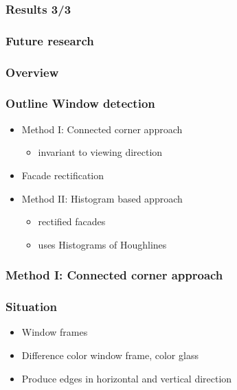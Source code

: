 \documentclass{beamer}
\begin{document}
\frame
{
	\frametitle{Results 3/3}
}

\frame
{
	\frametitle{Future research}

}

\frame
{
	\frametitle{Overview}
}




\frame
{
	\frametitle{Outline Window detection}
	\begin{itemize}
	\item  <+-| alert@+> Method I: Connected corner approach 
		\begin{itemize}
		\item  <+-| alert@+> invariant to viewing direction
		\end{itemize}
	\item  <+-| alert@+> Facade rectification 
	\item  <+-| alert@+> Method II: Histogram based approach
		\begin{itemize}
		\item  <+-| alert@+> rectified facades 
		\item  <+-| alert@+> uses Histograms of Houghlines
		\end{itemize}
	\end{itemize}
}

\frame
{
	\frametitle{Method I: Connected corner approach}
}


\frame
{
	\frametitle{Situation}
	\begin{itemize}
	\item  <+-| alert@+> Window frames 
	\item  <+-| alert@+> Difference color window frame, color glass
	\item  <+-| alert@+> Produce edges in horizontal and vertical direction
	\end{itemize}
}
\end{document}
